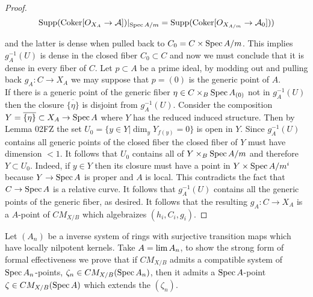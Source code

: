 \documentclass{stacks-project}
\theoremstyle{plain}
\theoremstyle{definition}
\DeclareMathOperator{\Spec}{Spec}
\theoremstyle{remark}
\numberwithin{equation}{subsection}
\def\lim{\mathop{\rm lim}\nolimits}
\def\Spec{\mathop{\rm Spec}}
\begin{document}
\begin{proof}
\[\text{Supp}(\text{Coker}[O_{X_A} \to \mathcal{A}])|_{\Spec A/m}=\text{Supp}(\text{Coker}[O_{X_{A/m}} \to \mathcal{A}_0]))\]

and the latter is dense when pulled back to $C_0=C \times \Spec A/m$. This implies $g_A^{-1}(U)$ is dense in the closed fiber $C_0 \subset C$ and now we must conclude that it is dense in every fiber of $C$. Let $p \subset A$ be a prime ideal, by modding out and pulling back $g_A: C \to X_A$ we may suppose that $p=(0)$ is the generic point of $A$. 
\\

If there is a generic point of the generic fiber $\eta \in C \times_B \Spec A_{(0)}$ not in $g_A^{-1}(U)$ then the closure $\overline{\{\eta\}}$ is disjoint from $g_A^{-1}(U)$. Consider the composition $Y=\overline{\{\eta\}} \subset X_A \to \Spec A$ where $Y$ has the reduced induced structure. Then by Lemma 02FZ the set $U_0=\{y \in Y|\dim_y Y_{f(y)} = 0 \}$ is open in $Y$. Since $g_A^{-1}(U)$ contains all generic points of the closed fiber the closed fiber of $Y$ must have dimension $<1$. It follows that $U_0$ contains all of $Y \times_B \Spec {A/m}$ and therefore $Y \subset U_0$. Indeed, if $y \in Y$ then its closure must have a point in $Y \times \Spec A/m^i$ because $Y \to \Spec A$ is proper and $A$ is local. This contradicts the fact that $C \to \Spec A$ is a relative curve. It follows that $g_A^{-1}(U)$ contains all the generic points of the generic fiber, as desired. It follows that the resulting $g_A: C \to X_A$ is a $A$-point of $CM_{X/B}$ which algebraizes $(h_i,C_i,g_i)$. 

\end{proof}


Let $(A_n)$ be a inverse system of rings with surjective transition maps which have locally nilpotent kernels. Take $A=\lim A_n$, to show the strong form of formal effectiveness we prove that if $CM_{X/B}$ admits a compatible system of $\Spec A_n$-points, $\zeta_n \in CM_{X/B}(\Spec A_n)$, then it admits a $\Spec A$-point $\zeta \in CM_{X/B}(\Spec A)$ which extends the $(\zeta_n)$. 
\end{document}
